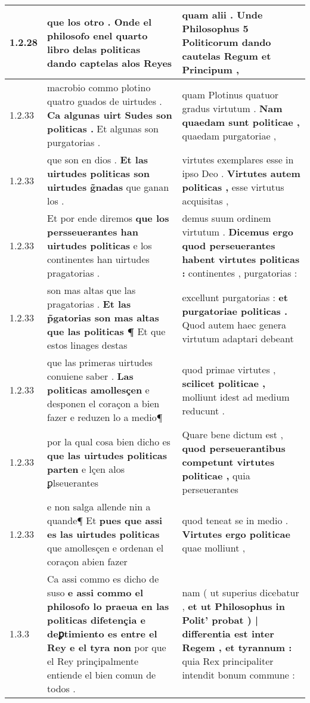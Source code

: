 \begin{tabular}{|p{1cm}|p{6.5cm}|p{6.5cm}|}
1.2.28 & que los otro . \textbf{ Onde el philosofo enel quarto libro delas politicas } dando captelas alos Reyes & quam alii . \textbf{ Unde Philosophus 5 Politicorum } dando cautelas Regum et Principum , \\\hline
1.2.33 & macrobio commo plotino quatro guados de uirtudes . \textbf{ Ca algunas uirt Sudes son politicas . } Et algunas son purgatorias . & quam Plotinus quatuor gradus virtutum . \textbf{ Nam quaedam sunt politicae , } quaedam purgatoriae , \\\hline
1.2.33 & que son en dios . \textbf{ Et las uirtudes politicas son uirtudes g̃nadas } que ganan los . & virtutes exemplares esse in ipso Deo . \textbf{ Virtutes autem politicas , } esse virtutus acquisitas , \\\hline
1.2.33 & Et por ende diremos \textbf{ que los persseuerantes han uirtudes politicas } e los continentes han uirtudes pragatorias . & demus suum ordinem virtutum . \textbf{ Dicemus ergo quod perseuerantes habent virtutes politicas : } continentes , purgatorias : \\\hline
1.2.33 & son mas altas que las pragatorias . \textbf{ Et las p̃gatorias son mas altas que las politicas ¶ } Et que estos linages destas & excellunt purgatorias : \textbf{ et purgatoriae politicas . } Quod autem haec genera virtutum adaptari debeant \\\hline
1.2.33 & que las primeras uirtudes conuiene saber . \textbf{ Las politicas amollesçen } e desponen el coraçon a bien fazer e reduzen lo a medio¶ & quod primae virtutes , \textbf{ scilicet politicae , } molliunt idest ad medium reducunt . \\\hline
1.2.33 & por la qual cosa bien dicho es \textbf{ que las uirtudes politicas parten } e lçen alos ꝑlseuerantes & Quare bene dictum est , \textbf{ quod perseuerantibus competunt virtutes politicae , } quia perseuerantes \\\hline
1.2.33 & e non salga allende nin a quande¶ Et \textbf{ pues que assi es las uirtudes politicas } que amollesçen e ordenan el coraçon abien fazer & quod teneat se in medio . \textbf{ Virtutes ergo politicae } quae molliunt , \\\hline
1.3.3 & Ca assi commo es dicho de suso \textbf{ e assi commo el philosofo lo praeua en las politicas difetençia e deꝑtimiento es entre el Rey e el tyra non } por que el Rey prinçipalmente entiende el bien comun de todos . & nam ( ut superius dicebatur , \textbf{ et ut Philosophus in Polit’ probat ) | differentia est inter Regem , et tyrannum : } quia Rex principaliter intendit bonum commune : \\\hline

\end{tabular}

